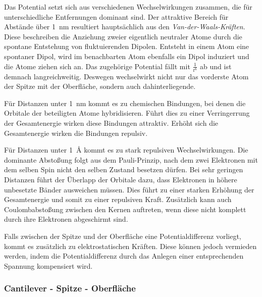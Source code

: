           Das Potential setzt sich aus verschiedenen Wechselwirkungen zusammen, die für unterschiedliche Entfernungen dominant sind.\newline 
          Der attraktive Bereich für Abstände über \SI{1}{\nano\metre} resultiert hauptsächlich aus den \textit{Van-der-Waals-Kräften}. Diese beschreiben die Anziehung zweier eigentlich neutraler Atome durch die 
          spontane Entstehung von fluktuierenden Dipolen. Entsteht in einem Atom eine 
          spontaner Dipol, wird im benachbarten Atom ebenfalls ein Dipol induziert und die Atome ziehen sich an. Das zugehörige Potential fällt mit $\frac{1}{\text{r}^6}$ ab und ist demnach langreichweitig. 
          Deswegen wechselwirkt nicht nur das vorderste Atom der Spitze mit der Oberfläche, sondern auch dahinterliegende.\newline

          Für Distanzen unter \SI{1}{\nano\metre} kommt es zu chemischen Bindungen, bei denen die Orbitale der beteiligten Atome hybridisieren. Führt dies zu einer Verringerrung der Gesamtenergie wirken diese 
          Bindungen attraktiv. Erhöht sich die Gesamtenergie wirken die Bindungen repulsiv.

          Für Distanzen unter \SI{1}{\angstrom} kommt es zu stark repulsiven Wechselwirkungen. Die dominante Abstoßung folgt aus dem Pauli-Prinzip, nach dem zwei Elektronen mit dem selben Spin nicht den selben 
          Zustand besetzen dürfen. Bei sehr geringen Distanzen führt der Überlapp der Orbitale dazu, dass Elektronen in höhere unbesetzte Bänder ausweichen müssen. Dies führt zu einer starken Erhöhung der 
          Gesamtenergie und somit zu einer repulsiven Kraft. Zusätzlich kann auch Coulombabstoßung zwischen den Kernen auftreten, wenn diese nicht komplett durch ihre Elektronen abgeschirmt sind.

          Falls zwischen der Spitze und der Oberfläche eine Potentialdifferenz vorliegt, kommt es zusätzlich zu elektrostatischen Kräften. Diese können jedoch vermieden werden, indem die Potentialdifferenz durch
          das Anlegen einer entsprechenden Spannung kompensiert wird.\newline

        
        \subsubsection{Cantilever - Spitze - Oberfläche}

          \FloatBarrier

